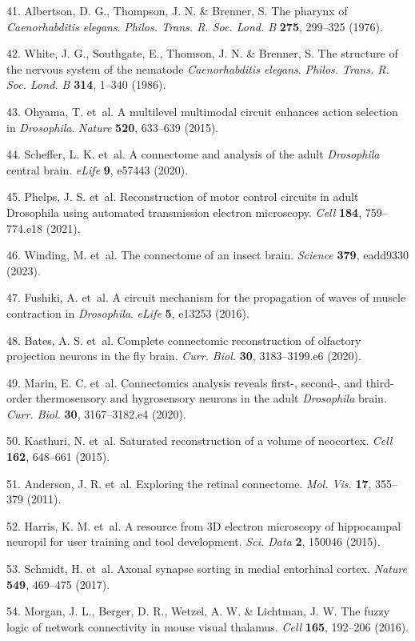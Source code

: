 \documentclass{article}
\begin{document}
\begin{hangpars}
41. Albertson, D. G., Thompson, J. N. \& Brenner, S. The pharynx of \emph{Caenorhabditis elegans}. \emph{Philos. Trans. R. Soc. Lond. B} \textbf{275}, 299–325 (1976). 

42. White, J. G., Southgate, E., Thomson, J. N. \& Brenner, S. The structure of the nervous system of the nematode \emph{Caenorhabditis elegans}. \emph{Philos. Trans. R. Soc. Lond. B} \textbf{314}, 1–340 (1986). 

43. Ohyama, T. et~al. A multilevel multimodal circuit enhances action selection in \emph{Drosophila}. \emph{Nature} \textbf{520}, 633–639 (2015). 

44. Scheffer, L. K. et~al. A connectome and analysis of the adult \emph{Drosophila} central brain. \emph{eLife} \textbf{9}, e57443 (2020). 

45. Phelps, J. S. et~al. Reconstruction of motor control circuits in adult Drosophila using automated transmission electron microscopy. \emph{Cell} \textbf{184}, 759–774.e18 (2021). 

46. Winding, M. et~al. The connectome of an insect brain. \emph{Science} \textbf{379}, eadd9330 (2023). 

47. Fushiki, A. et~al. A circuit mechanism for the propagation of waves of muscle contraction in \emph{Drosophila}. \emph{eLife} \textbf{5}, e13253 (2016). 

48. Bates, A. S. et~al. Complete connectomic reconstruction of olfactory projection neurons in the fly brain. \emph{Curr. Biol.} \textbf{30}, 3183–3199.e6 (2020). 

49. Marin, E. C. et~al. Connectomics analysis reveals first-, second-, and third-order thermosensory and hygrosensory neurons in the adult \emph{Drosophila} brain. \emph{Curr. Biol.} \textbf{30}, 3167–3182.e4 (2020). 

50. Kasthuri, N. et~al. Saturated reconstruction of a volume of neocortex. \emph{Cell} \textbf{162}, 648–661 (2015). 

51. Anderson, J. R. et~al. Exploring the retinal connectome. \emph{Mol. Vis.} \textbf{17}, 355–379 (2011). 

52. Harris, K. M. et~al. A resource from 3D electron microscopy of hippocampal neuropil for user training and tool development. \emph{Sci. Data} \textbf{2}, 150046 (2015). 

53. Schmidt, H. et~al. Axonal synapse sorting in medial entorhinal cortex. \emph{Nature} \textbf{549}, 469–475 (2017). 

54. Morgan, J. L., Berger, D. R., Wetzel, A. W. \& Lichtman, J. W. The fuzzy logic of network connectivity in mouse visual thalamus. \emph{Cell} \textbf{165}, 192–206 (2016). 


\end{hangpars}
\end{document}
